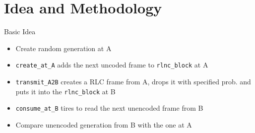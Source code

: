 \documentclass[t]{beamer} %
\begin{document}
\section{Idea and Methodology}
\begin{frame}{Basic Idea}
    \begin{figure}[htb]
    \end{figure}
  \pause
  \begin{itemize}
    \begin{itemize}
    \item Create random generation at A
  \pause
    \item \texttt{create\_at\_A} adds the next uncoded frame to \texttt{rlnc\_block} at A
  \pause
    \item \texttt{transmit\_A2B} creates a RLC frame from A, drops it with specified prob. and puts it into the \texttt{rlnc\_block} at B
  \pause
    \item \texttt{consume\_at\_B} tires to read the next unencoded frame from B
  \pause
    \item Compare unencoded generation from B with the one at A
    \end{itemize}
  \end{itemize}
\end{frame}
\end{document}
